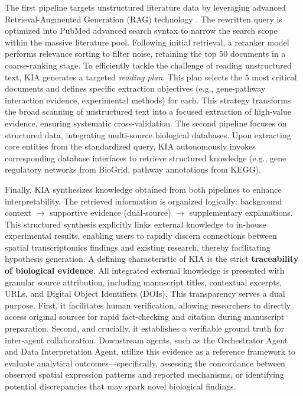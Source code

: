 \documentclass[11pt,a4paper]{article}
\begin{document}
The first pipeline targets unstructured literature data by leveraging advanced Retrieval-Augmented Generation (RAG) technology \cite{lewis2020retrieval}. The rewritten query is optimized into PubMed advanced search syntax to narrow the search scope within the massive literature pool. Following initial retrieval, a reranker model performs relevance sorting to filter noise, retaining the top 50 documents in a coarse-ranking stage. To efficiently tackle the challenge of reading unstructured text, KIA generates a targeted \textit{reading plan}. This plan selects the 5 most critical documents and defines specific extraction objectives (e.g., gene-pathway interaction evidence, experimental methods) for each. This strategy transforms the broad scanning of unstructured text into a focused extraction of high-value evidence, ensuring systematic cross-validation.
The second pipeline focuses on structured data, integrating multi-source biological databases. Upon extracting core entities from the standardized query, KIA autonomously invokes corresponding database interfaces to retrieve structured knowledge (e.g., gene regulatory networks from BioGrid, pathway annotations from KEGG). 

Finally, KIA synthesizes knowledge obtained from both pipelines to enhance interpretability. The retrieved information is organized logically: background context $\rightarrow$ supportive evidence (dual-source) $\rightarrow$ supplementary explanations. This structured synthesis explicitly links external knowledge to in-house experimental results, enabling users to rapidly discern connections between spatial transcriptomics findings and existing research, thereby facilitating hypothesis generation.
A defining characteristic of KIA is the strict \textbf{traceability of biological evidence}. All integrated external knowledge is presented with granular source attribution, including manuscript titles, contextual excerpts, URLs, and Digital Object Identifiers (DOIs). This transparency serves a dual purpose. First, it facilitates human verification, allowing researchers to directly access original sources for rapid fact-checking and citation during manuscript preparation. Second, and crucially, it establishes a verifiable ground truth for inter-agent collaboration. Downstream agents, such as the Orchestrator Agent and Data Interpretation Agent, utilize this evidence as a reference framework to evaluate analytical outcomes—specifically, assessing the concordance between observed spatial expression patterns and reported mechanisms, or identifying potential discrepancies that may spark novel biological findings.
\end{document}
